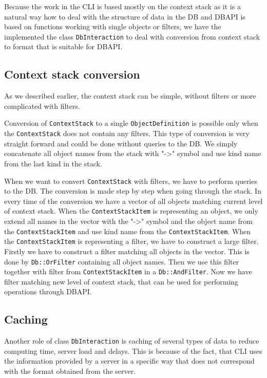 \documentclass[deska]{subfiles}
\begin{document}
Because the work in the CLI is based mostly on the context stack as it is a natural way how to deal with the structure
of data in the DB and DBAPI is based on functions working with single objects or filters, we have the implemented the
class {\tt DbInteraction} to deal with conversion from context stack to format that is suitable for DBAPI.

\subsection{Context stack conversion}

As we described earlier, the context stack can be simple, without filters or more complicated with filters.

Conversion of {\tt ContextStack} to a single {\tt ObjectDefinition} is possible only when the {\tt ContextStack} does
not contain any filters. This type of conversion is very straight forward and could be done without queries to the DB.
We simply concatenate all object names from the stack with "->" symbol and use kind name from the last kind in the stack.

When we want to convert {\tt ContextStack} with filters, we have to perform queries to the DB. The conversion is made
step by step when going through the stack. In every time of the conversion we have a vector of all objects matching current
level of context stack. When the {\tt ContextStackItem} is representing an object, we only extend all names in the vector
with the "->" symbol and the object name from the {\tt ContextStackItem} and use kind name from the {\tt ContextStackItem}.
When the {\tt ContextStackItem} is representing a filter, we have to construct a large filter. Firstly we have to construct
a filter matching all objects in the vector. This is done by {\tt Db::OrFilter} containing all object names. Then we use
this filter together with filter from {\tt ContextStackItem} in a {\tt Db::AndFilter}. Now we have filter matching new
level of context stack, that can be used for performing operations through DBAPI.

\subsection{Caching}

Another role of class {\tt DbInteraction} is caching of several types of data to reduce computing time, server load and delays.
This is because of the fact, that CLI uses the information provided by a server in a specific way that does not correspond
with the format obtained from the server.
\end{document}
